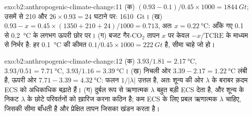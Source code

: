 \begin{solution}{exo:b2:anthropogenic-climate-change:11}
(क) $(0.93 - 0.1)/0.45 \times 1000 = \qty{1844}{Gt}$; उसमें से 210 और $26 \times 0.93 = 24$ घटाने पर:
\qty{1610}{Gt}। (ख) $0.93 - x = 0.45 \times (1350 + 210 + 24)/1000 = 0.713$, अतः $x =
\qty{0.22}{\celsius}$: आँके गए 0.1 से \qty{0.2}{\celsius} के लगभग ऊपरी छोर पर। (ग)
बजट गैर-CO$_2$ तापन $x$ पर केवल $-x/\text{TCRE}$ के माध्यम से निर्भर है: हर
\qty{0.1}{\celsius} की कीमत $0.1/0.45 \times 1000 = \qty{222}{Gt}$ है, सीमा चाहे जो हो।
\end{solution}

\begin{solution}{exo:b2:anthropogenic-climate-change:12}
(क) $3.93/1.81 = \qty{2.17}{\celsius}$, $3.93/0.51 = \qty{7.71}{\celsius}$, $3.93/1.16 =
\qty{3.39}{\celsius}$। (ख) निचली ओर $3.39 - 2.17 = \qty{1.22}{\celsius}$ लंबी है, ऊपरी ओर
$7.71 - 3.39 = \qty{4.32}{\celsius}$: फलन $1/|\lambda|$ उत्तल है, अतः शून्य की ओर
$\lambda$ के बराबर क़दम ECS को अधिकाधिक बढ़ाते हैं। (ग) दुर्बल रूप से ऋणात्मक $\lambda$ बहुत
बड़ी ECS देता है, और शून्य के निकट $\lambda$ के छोटे परिवर्तनों को ख़ारिज करना कठिन है; कम ECS के लिए प्रबल
ऋणात्मक $\lambda$ चाहिए, जिसकी सीमा  बाँधती है और प्रेक्षित तापन जिसका खंडन करता है।
\end{solution}

